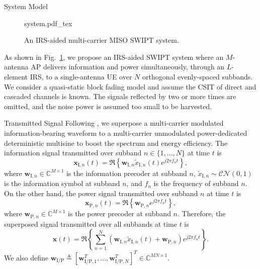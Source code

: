 \documentclass[journal]{IEEEtran}
\begin{document}
	\begin{section}{System Model}\label{se:system_model}
		\begin{figure}[!t]
			\centering
			\def\svgwidth{0.9\columnwidth}
			{system.pdf_tex}
			\caption{An IRS-aided multi-carrier MISO SWIPT system.}
			\label{fi:system}
		\end{figure}

		As shown in Fig.~\ref{fi:system}, we propose an IRS-aided SWIPT system where an $M$-antenna AP delivers information and power simultaneously, through an $L$-element IRS, to a single-antenna UE over $N$ orthogonal evenly-spaced subbands. We consider a quasi-static block fading model and assume the CSIT of direct and cascaded channels is known. The signals reflected by two or more times are omitted, and the noise power is assumed too small to be harvested.


		\begin{subsection}{Transmitted Signal}
			Following \cite{Clerckx2018b}, we superpose a multi-carrier modulated information-bearing waveform to a multi-carrier unmodulated power-dedicated deterministic multisine to boost the spectrum and energy efficiency. The information signal transmitted over subband $n \in \{1, \dots, N\}$ at time $t$ is
			\begin{equation}
				\boldsymbol{x}_{\mathrm{I},n}(t) = \Re\left\{\boldsymbol{w}_{\mathrm{I},n} \tilde{x}_{\mathrm{I},n}(t) e^{j2{\pi}{f_n}{t}}\right\},
			\end{equation}
			where $\boldsymbol{w}_{\mathrm{I},n} \in \mathbb{C}^{M \times 1}$ is the information precoder at subband $n$, $\tilde{x}_{\mathrm{I},n}\sim\mathcal{CN}(0,1)$ is the information symbol at subband $n$, and $f_n$ is the frequency of subband $n$. On the other hand, the power signal transmitted over subband $n$ at time $t$ is
			\begin{equation}
				\boldsymbol{x}_{\mathrm{P},n}(t) = \Re\left\{\boldsymbol{w}_{\mathrm{P},n} e^{j2{\pi}{f_n}{t}}\right\},
			\end{equation}
			where $\boldsymbol{w}_{\mathrm{P},n} \in \mathbb{C}^{M \times 1}$ is the power precoder at subband $n$. Therefore, the superposed signal transmitted over all subbands at time $t$ is
			\begin{equation}
				\boldsymbol{x}(t) = \Re{\left\{\sum_{n=1}^N(\boldsymbol{w}_{\mathrm{I},n}\tilde{x}_{\mathrm{I},n}(t)+\boldsymbol{w}_{\mathrm{P},n}){e^{j2{\pi}{f_n}{t}}}\right\}}.
			\end{equation}
			We also define $\boldsymbol{w}_{\mathrm{I/P}} \triangleq [\boldsymbol{w}_{\mathrm{I/P},1}^T,\dots,\boldsymbol{w}_{\mathrm{I/P},N}^T]^T \in \mathbb{C}^{MN \times 1}$.
		\end{subsection}



\end{section}
\end{document}
